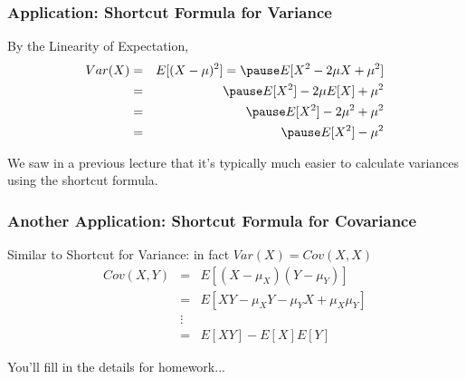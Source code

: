 \documentclass[handout]{beamer}
\begin{document}

\begin{frame}
\frametitle{Application: Shortcut Formula for Variance}

By the Linearity of Expectation, 
\begin{eqnarray*}
	Var(X) &=&  E[(X - \mu)^2] = \pause E[X^2 - 2\mu X + \mu^2]\\
		&=& \pause E[X^2] - 2\mu E[X] + \mu^2\\
		&=& \pause E[X^2] - 2\mu^2 + \mu^2\\
		&=& \pause E[X^2] - \mu^2
\end{eqnarray*}

\alert{We saw in a previous lecture that it's typically much easier to calculate variances using the shortcut formula.}

\end{frame}


\begin{frame}
\frametitle{Another Application: Shortcut Formula for Covariance}
\alert{Similar to Shortcut for Variance: in fact $Var(X) = Cov(X,X)$}
\begin{eqnarray*}
	Cov(X,Y)&=& E[(X - \mu_X)(Y-\mu_Y)]\\
			&=& E[XY - \mu_X Y - \mu_Y X + \mu_X \mu_Y]\\
			&\vdots& \\
			&=& E[XY] - E[X]E[Y]
\end{eqnarray*}

\hfill \alert{You'll fill in the details for homework...}
\end{frame}
\end{document}
